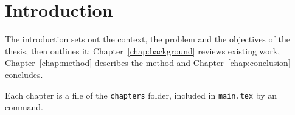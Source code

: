 \chapter{Introduction}
\label{chap:introduction}

The introduction sets out the context, the problem and the objectives of the
thesis, then outlines it: Chapter~\ref{chap:background} reviews existing
work, Chapter~\ref{chap:method} describes the method and
Chapter~\ref{chap:conclusion} concludes.

Each chapter is a file of the \texttt{chapters} folder, included in
\texttt{main.tex} by an \verb|| command.
